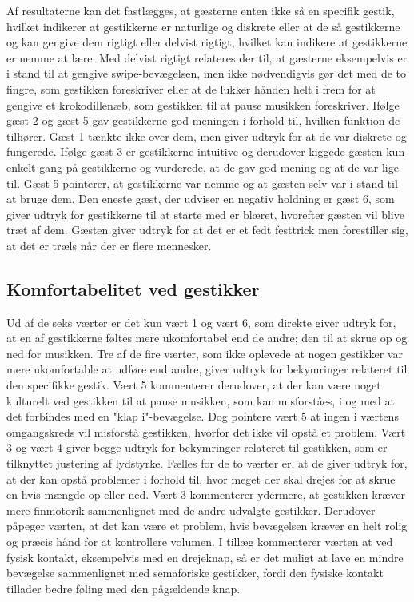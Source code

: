 Af resultaterne kan det fastlægges, at gæsterne enten ikke så en specifik gestik, hvilket indikerer at gestikkerne er naturlige og diskrete eller at de så gestikkerne og kan gengive dem rigtigt eller delvist rigtigt, hvilket kan indikere at gestikkerne er nemme at lære. Med delvist rigtigt relateres der til, at gæsterne eksempelvis er i stand til at gengive swipe-bevægelsen, men ikke nødvendigvis gør det med de to fingre, som gestikken foreskriver eller at de lukker hånden helt i frem for at gengive et krokodillenæb, som gestikken til at pause musikken foreskriver. Ifølge gæst 2 og gæst 5 gav gestikkerne god meningen i forhold til, hvilken funktion de tilhører. Gæst 1 tænkte ikke over dem, men giver udtryk for at de var diskrete og fungerede. Ifølge gæst 3 er gestikkerne intuitive og derudover kiggede gæsten kun enkelt gang på gestikkerne og vurderede, at de gav god mening og at de var lige til. Gæst 5 pointerer, at gestikkerne var nemme og at gæsten selv var i stand til at bruge dem. Den eneste gæst, der udviser en negativ holdning er gæst 6, som giver udtryk for gestikkerne til at starte med er blæret, hvorefter gæsten vil blive træt af dem. Gæsten giver udtryk for at det er et fedt festtrick men forestiller sig, at det er træls når der er flere mennesker.
%
\subsection{Komfortabelitet ved gestikker}
\label{TestresultaterSocialAcceptGestikkerUkomfortabelt}
%
Ud af de seks værter er det kun vært 1 og vært 6, som direkte giver udtryk for, at en af gestikkerne føltes mere ukomfortabel end de andre; den til at skrue op og ned for musikken. Tre af de fire værter, som ikke oplevede at nogen gestikker var mere ukomfortable at udføre end andre, giver udtryk for bekymringer relateret til den specifikke gestik. Vært 5 kommenterer derudover, at der kan være noget kulturelt ved gestikken til at pause musikken, som kan misforståes, i og med at det forbindes med en "klap i"-bevægelse. Dog pointere vært 5 at ingen i værtens omgangskreds vil misforstå gestikken, hvorfor det ikke vil opstå et problem. Vært 3 og vært 4 giver begge udtryk for bekymringer relateret til gestikken, som er tilknyttet justering af lydstyrke. Fælles for de to værter er, at de giver udtryk for, at der kan opstå problemer i forhold til, hvor meget der skal drejes for at skrue en hvis mængde op eller ned. Vært 3 kommenterer ydermere, at gestikken kræver mere finmotorik sammenlignet med de andre udvalgte gestikker. Derudover påpeger værten, at det kan være et problem, hvis bevægelsen kræver en helt rolig og præcis hånd for at kontrollere volumen. I tillæg kommenterer værten at ved fysisk kontakt, eksempelvis med en drejeknap, så er det muligt at lave en mindre bevægelse sammenlignet med semaforiske gestikker, fordi den fysiske kontakt tillader bedre føling med den pågældende knap. 

